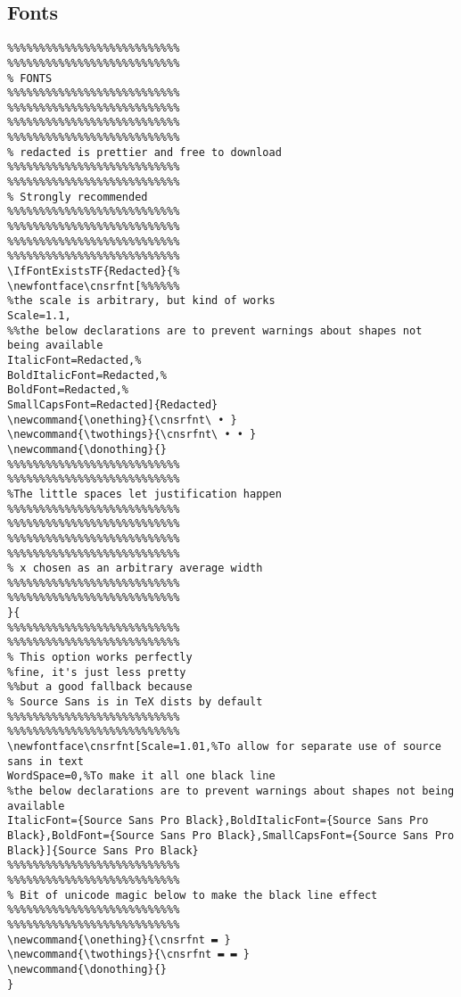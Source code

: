 \documentclass{article}
\begin{document}
\subsection{Fonts}
\begin{verbatim}
%%%%%%%%%%%%%%%%%%%%%%%%%%%
%%%%%%%%%%%%%%%%%%%%%%%%%%%
% FONTS
%%%%%%%%%%%%%%%%%%%%%%%%%%%
%%%%%%%%%%%%%%%%%%%%%%%%%%%
%%%%%%%%%%%%%%%%%%%%%%%%%%%
%%%%%%%%%%%%%%%%%%%%%%%%%%%
% redacted is prettier and free to download
%%%%%%%%%%%%%%%%%%%%%%%%%%%
%%%%%%%%%%%%%%%%%%%%%%%%%%%
% Strongly recommended
%%%%%%%%%%%%%%%%%%%%%%%%%%%
%%%%%%%%%%%%%%%%%%%%%%%%%%%
%%%%%%%%%%%%%%%%%%%%%%%%%%%
%%%%%%%%%%%%%%%%%%%%%%%%%%%
\IfFontExistsTF{Redacted}{%
\newfontface\cnsrfnt[%%%%%%
%the scale is arbitrary, but kind of works
Scale=1.1,
%%the below declarations are to prevent warnings about shapes not being available
ItalicFont=Redacted,%
BoldItalicFont=Redacted,%
BoldFont=Redacted,%
SmallCapsFont=Redacted]{Redacted}
\newcommand{\onething}{\cnsrfnt\ • }
\newcommand{\twothings}{\cnsrfnt\ • • }
\newcommand{\donothing}{}
%%%%%%%%%%%%%%%%%%%%%%%%%%%
%%%%%%%%%%%%%%%%%%%%%%%%%%%
%The little spaces let justification happen
%%%%%%%%%%%%%%%%%%%%%%%%%%%
%%%%%%%%%%%%%%%%%%%%%%%%%%%
%%%%%%%%%%%%%%%%%%%%%%%%%%%
%%%%%%%%%%%%%%%%%%%%%%%%%%%
% x chosen as an arbitrary average width
%%%%%%%%%%%%%%%%%%%%%%%%%%%
%%%%%%%%%%%%%%%%%%%%%%%%%%%
}{
%%%%%%%%%%%%%%%%%%%%%%%%%%%
%%%%%%%%%%%%%%%%%%%%%%%%%%%
% This option works perfectly
%fine, it's just less pretty
%%but a good fallback because
% Source Sans is in TeX dists by default
%%%%%%%%%%%%%%%%%%%%%%%%%%%
%%%%%%%%%%%%%%%%%%%%%%%%%%%
\newfontface\cnsrfnt[Scale=1.01,%To allow for separate use of source sans in text
WordSpace=0,%To make it all one black line
%the below declarations are to prevent warnings about shapes not being available
ItalicFont={Source Sans Pro Black},BoldItalicFont={Source Sans Pro Black},BoldFont={Source Sans Pro Black},SmallCapsFont={Source Sans Pro Black}]{Source Sans Pro Black}
%%%%%%%%%%%%%%%%%%%%%%%%%%%
%%%%%%%%%%%%%%%%%%%%%%%%%%%
% Bit of unicode magic below to make the black line effect
%%%%%%%%%%%%%%%%%%%%%%%%%%%
%%%%%%%%%%%%%%%%%%%%%%%%%%%
\newcommand{\onething}{\cnsrfnt ▬ }
\newcommand{\twothings}{\cnsrfnt ▬ ▬ }
\newcommand{\donothing}{}
}
\end{verbatim}
\end{document}
